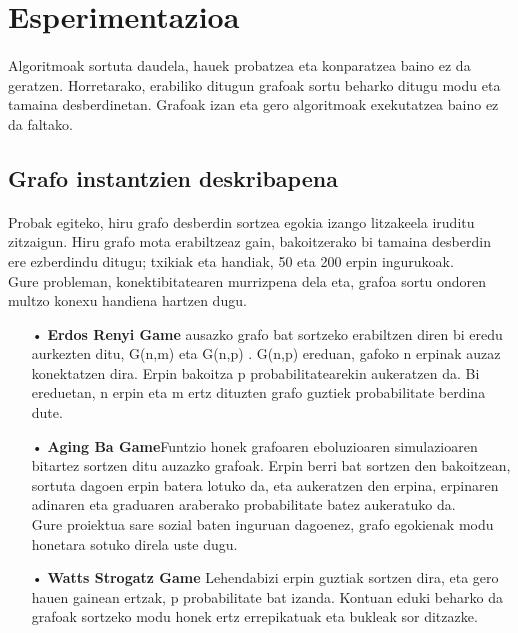 \documentclass[eu,gi]{ifirak}\usepackage[]{graphicx}\usepackage[]{color}
\begin{document}
\pagebreak
\section{Esperimentazioa}
\paragraph{}
Algoritmoak sortuta daudela, hauek probatzea eta konparatzea baino ez da geratzen. Horretarako, erabiliko ditugun grafoak sortu beharko ditugu modu eta tamaina desberdinetan. Grafoak izan eta gero algoritmoak exekutatzea baino ez da faltako.
 
\subsection{Grafo instantzien deskribapena}
\paragraph{}
Probak egiteko, hiru grafo desberdin sortzea egokia izango litzakeela iruditu zitzaigun. Hiru grafo mota erabiltzeaz gain, bakoitzerako bi tamaina desberdin ere ezberdindu ditugu; txikiak eta handiak, 50 eta 200 erpin ingurukoak.\\

Gure probleman, konektibitatearen murrizpena dela eta, grafoa sortu ondoren multzo konexu handiena hartzen dugu.\\

\begin{itemize}
\item[•]\textbf{Erdos Renyi Game} ausazko grafo bat sortzeko erabiltzen diren bi eredu aurkezten ditu, G(n,m) eta G(n,p) . G(n,p) ereduan, gafoko n erpinak auzaz konektatzen dira. Erpin bakoitza p probabilitatearekin aukeratzen da. Bi ereduetan, n erpin eta m ertz dituzten grafo guztiek probabilitate berdina dute.
\item[•]\textbf{Aging Ba Game}Funtzio honek grafoaren eboluzioaren simulazioaren bitartez sortzen ditu auzazko grafoak. Erpin berri bat sortzen den bakoitzean, sortuta dagoen erpin batera lotuko da, eta aukeratzen den erpina, erpinaren adinaren eta graduaren araberako probabilitate batez aukeratuko da.\\Gure proiektua sare sozial baten inguruan dagoenez, grafo egokienak modu honetara sotuko direla uste dugu. 
\item[•]\textbf{Watts Strogatz Game} Lehendabizi erpin guztiak sortzen dira, eta gero hauen gainean ertzak, p probabilitate bat izanda. Kontuan eduki beharko da grafoak sortzeko modu honek ertz errepikatuak eta bukleak sor ditzazke.\\
\end{itemize}
\end{document}
